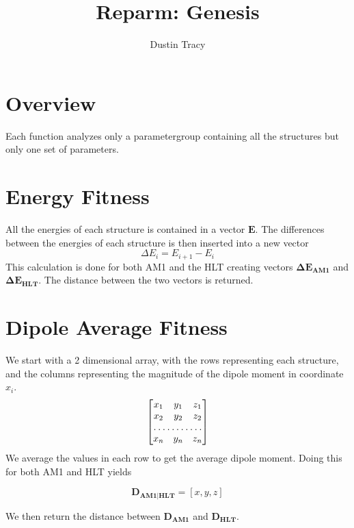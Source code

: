 \documentclass[12pt]{article}
\title{Reparm: Genesis}
\author{Dustin Tracy}
\begin{document}
\maketitle

\section{Overview}
Each function analyzes only a parametergroup containing all the structures but only one set of parameters.


\section{Energy Fitness}
All the energies of each structure is contained in a vector $\mathbf{E}$.
The differences between the energies of each structure is then inserted into a new vector
\begin{equation}
  \label{eq:energy_differences}
  \Delta E_{i} = E_{i+1} - E_{i}
\end{equation}
This calculation is done for both AM1 and the HLT creating vectors $\mathbf{\Delta E_{AM1}}$ and $\mathbf{\Delta E_{HLT}}$.
The distance between the two vectors is returned.


\section{Dipole Average Fitness}
We start with a 2 dimensional array, with the rows representing each structure, and the columns representing the magnitude of the dipole moment in coordinate $x_i$.
\[
\begin{bmatrix}
  x_{1} & y_{1} & z_{1} \\
  x_{2} & y_{2} & z_{2} \\
  \hdotsfor{3}   \\
  x_n & y_n & z_n
\end{bmatrix}
\]
We average the values in each row to get the average dipole moment.
Doing this for both AM1 and HLT yields

\begin{equation}
  \mathbf{D_{AM1|HLT}} = \left[x, y, z\right]
\end{equation}

We then return the distance between $\mathbf{D_{AM1}}$ and $\mathbf{D_{HLT}}$.
\end{document}

